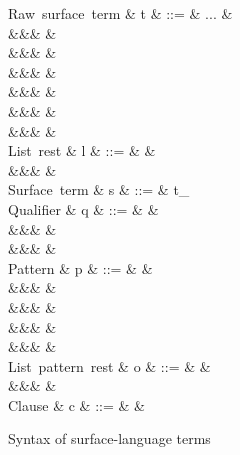 \begin{figure}[H]
\begin{syntaxfig}
\mbox{Raw surface term}
&
t
&
::=
&
...
&
\\
&&&
&
\\
&&&
&
\\
&&&
&
\\
&&&
&
\\
&&&
&
\\
&&&
&
\\[2mm]

\mbox{List rest}
&
l
&
::=
&
\annot{\sExNil}{\alpha}
&
\\
&&&
&
\\[2mm]

\mbox{Surface term}
&
s
&
::=
&
t_{\alpha}
\\[2mm]


\mbox{Qualifier}
&
q
&
::=
&
&
\\
&&&
&
\\
&&&
&
\\[2mm]


\mbox{Pattern}
&
p
&
::=
&
&
\\
&&&
\pattNil
&
\\
&&&
&
\\
&&&
&
\\
&&&
&
\\[2mm]

\mbox{List pattern rest}
&
o
&
::=
&
\pattSNil
&
\\
&&&
&
\\[2mm]

\mbox{Clause}
&
c
&
::=
&
&
\\[2mm]
\end{syntaxfig}
\caption{Syntax of surface-language terms}
\end{figure}
